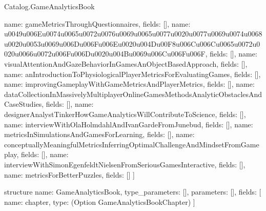 \begin{lexlean}{Catalog.GameAnalyticsBook}
\begin{semanticmodule}
{    {name: gameMetricsThroughQuestionnaires, fields: []},
    {name: u0049u006Eu0074u0065u0072u0076u0069u0065u0077u0020u0077u0069u0074u0068u0020u0053u0069u006Du006Fu006Eu0020u004Du00F8u006Cu006Cu0065u0072u0020u0066u0072u006Fu006Du0020u004Bu0069u006Cu006Fu006F, fields: []},
    {name: visualAttentionAndGazeBehaviorInGamesAnObjectBasedApproach, fields: []},
    {name: anIntroductionToPhysiologicalPlayerMetricsForEvaluatingGames, fields: []},
    {name: improvingGameplayWithGameMetricsAndPlayerMetrics, fields: []},
    {name: dataCollectionInMassivelyMultiplayerOnlineGamesMethodsAnalyticObstaclesAndCaseStudies, fields: []},
    {name: designerAnalystTinkerHowGameAnalyticsWillContributeToScience, fields: []},
    {name: interviewWithOlaHolmdahlAndIvanGardeFromJunebud, fields: []},
    {name: metricsInSimulationsAndGamesForLearning, fields: []},
    {name: conceptuallyMeaningfulMetricsInferringOptimalChallengeAndMindsetFromGameplay, fields: []},
    {name: interviewWithSimonEgenfeldtNielsenFromSeriousGamesInteractive, fields: []},
    {name: metricsForBetterPuzzles, fields: []}
  ]
}

structure{
  name: GameAnalyticsBook,
  type_parameters: [],
  parameters: [],
  fields: [
    {name: chapter, type: (Option GameAnalyticsBookChapter)}
  ]
}
\end{semanticmodule}
\end{lexlean}
